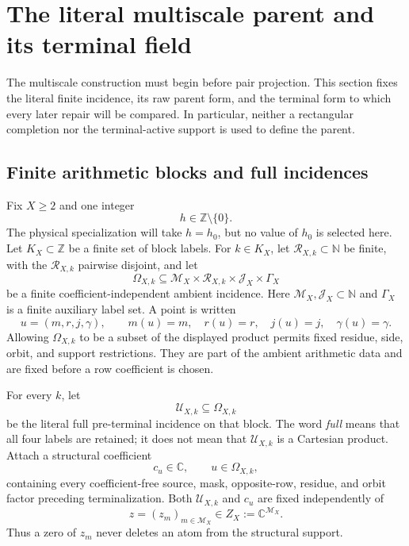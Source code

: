 \section{The literal multiscale parent and its terminal field}
\label{sec:tpc64-literal-parent}

The multiscale construction must begin before pair projection.  This
section fixes the literal finite incidence, its raw parent form, and the
terminal form to which every later repair will be compared.  In
particular, neither a rectangular completion nor the terminal-active
support is used to define the parent.

\subsection{Finite arithmetic blocks and full incidences}

Fix \(X\ge 2\) and one integer
\begin{equation}
 h\in\mathbb Z\setminus\{0\}.
 \label{eq:tpc64-fixed-shift}
\end{equation}
The physical specialization will take \(h=h_0\), but no value of \(h_0\)
is selected here.  Let \(K_X\subset\mathbb Z\) be a finite set of block
labels.  For \(k\in K_X\), let
\(\mathcal R_{X,k}\subset\mathbb N\) be finite, with the
\(\mathcal R_{X,k}\) pairwise disjoint, and let
\begin{equation}
 \Omega_{X,k}\subseteq
 \mathcal M_X\times\mathcal R_{X,k}
 \times\mathcal J_X\times\Gamma_X
 \label{eq:tpc64-block-ambient}
\end{equation}
be a finite coefficient-independent ambient incidence.  Here
\(\mathcal M_X,\mathcal J_X\subset\mathbb N\) and \(\Gamma_X\) is a
finite auxiliary label set.  A point is written
\[
 u=(m,r,j,\gamma),\qquad
 m(u)=m,\quad r(u)=r,\quad j(u)=j,\quad\gamma(u)=\gamma.
\]
Allowing \(\Omega_{X,k}\) to be a subset of the displayed product permits
fixed residue, side, orbit, and support restrictions.  They are part of
the ambient arithmetic data and are fixed before a row coefficient is
chosen.

For every \(k\), let
\begin{equation}
 \mathcal U_{X,k}\subseteq\Omega_{X,k}
 \label{eq:tpc64-literal-full-incidence}
\end{equation}
be the literal full pre-terminal incidence on that block.  The word
\emph{full} means that all four labels are retained; it does not mean that
\(\mathcal U_{X,k}\) is a Cartesian product.  Attach a structural
coefficient
\begin{equation}
 c_u\in\mathbb C,\qquad u\in\Omega_{X,k},
 \label{eq:tpc64-structural-coefficient}
\end{equation}
containing every coefficient-free source, mask, opposite-row, residue,
and orbit factor preceding terminalization.  Both
\(\mathcal U_{X,k}\) and \(c_u\) are fixed independently of
\[
 z=(z_m)_{m\in\mathcal M_X}\in
 Z_X:=\mathbb C^{\mathcal M_X}.
\]
Thus a zero of \(z_m\) never deletes an atom from the structural support.

